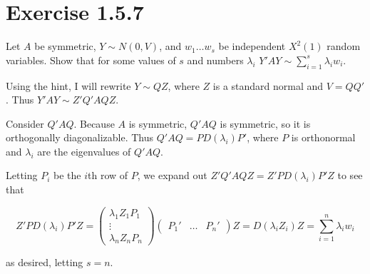 \documentclass{article}
\begin{document}
\section*{Exercise 1.5.7}
Let $A$ be symmetric, $Y \sim N(0, V)$, and $w_1 \dots w_s$ be independent $X^2(1)$ random variables. Show that for some values of $s$ and numbers $\lambda_i$ $Y'AY \sim \sum_{i=1}^s \lambda_i w_i$.

Using the hint, I will rewrite $Y \sim QZ$, where $Z$ is a standard normal and $V = QQ'$. Thus $Y'AY \sim Z'Q'AQZ$.

Consider $Q'AQ$. Because $A$ is symmetric, $Q'AQ$ is symmetric, so it is orthogonally diagonalizable. Thus $Q'AQ = PD(\lambda_i)P'$, where $P$ is orthonormal and $\lambda_i$ are the eigenvalues of $Q'AQ$.

Letting $P_i$ be the $i$th row of $P$, we expand out $Z'Q'AQZ = Z'PD(\lambda_i)P'Z$ to see that

\[
Z'PD(\lambda_i)P'Z = 
\begin{pmatrix}
\lambda_1 Z_1 P_1 \\
\vdots \\
\lambda_n Z_n P_n
\end{pmatrix}
\begin{pmatrix}
P_1' & \dots & P_n'
\end{pmatrix}
Z
=
D(\lambda_iZ_i)Z = \sum_{i=1}^n \lambda_i w_i
\]

as desired, letting $s=n$.
\end{document}
